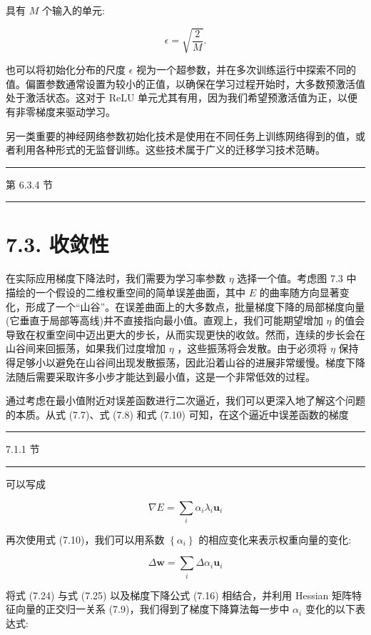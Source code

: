 \documentclass[10pt]{report}
\newcommand{\HRule}{\begin{center}\rule{0.9\linewidth}{0.2mm}\end{center}}
\begin{document}
具有 \(M\) 个输入的单元:

\[
\epsilon  = \sqrt{\frac{2}{M}}. \tag{7.23}
\]

也可以将初始化分布的尺度 \(\epsilon\) 视为一个超参数，并在多次训练运行中探索不同的值。偏置参数通常设置为较小的正值，以确保在学习过程开始时，大多数预激活值处于激活状态。这对于 ReLU 单元尤其有用，因为我们希望预激活值为正，以便有非零梯度来驱动学习。

另一类重要的神经网络参数初始化技术是使用在不同任务上训练网络得到的值，或者利用各种形式的无监督训练。这些技术属于广义的迁移学习技术范畴。

\HRule

第 6.3.4 节

\HRule

\section*{7.3. 收敛性}

在实际应用梯度下降法时，我们需要为学习率参数 \(\eta\) 选择一个值。考虑图 7.3 中描绘的一个假设的二维权重空间的简单误差曲面，其中 \(E\) 的曲率随方向显著变化，形成了一个“山谷”。在误差曲面上的大多数点，批量梯度下降的局部梯度向量(它垂直于局部等高线)并不直接指向最小值。直观上，我们可能期望增加 \(\eta\) 的值会导致在权重空间中迈出更大的步长，从而实现更快的收敛。然而，连续的步长会在山谷间来回振荡，如果我们过度增加 \(\eta\) ，这些振荡将会发散。由于必须将 \(\eta\) 保持得足够小以避免在山谷间出现发散振荡，因此沿着山谷的进展非常缓慢。梯度下降法随后需要采取许多小步才能达到最小值，这是一个非常低效的过程。

通过考虑在最小值附近对误差函数进行二次逼近，我们可以更深入地了解这个问题的本质。从式 (7.7)、式 (7.8) 和式 (7.10) 可知，在这个逼近中误差函数的梯度

\HRule

7.1.1 节

\HRule

可以写成

\[
\nabla E = \mathop{\sum }\limits_{i}{\alpha }_{i}{\lambda }_{i}{\mathbf{u}}_{i} \tag{7.24}
\]

再次使用式 (7.10)，我们可以用系数 \(\left\{  {\alpha }_{i}\right\}\) 的相应变化来表示权重向量的变化:

\[
\Delta \mathbf{w} = \mathop{\sum }\limits_{i}\Delta {\alpha }_{i}{\mathbf{u}}_{i} \tag{7.25}
\]

将式 (7.24) 与式 (7.25) 以及梯度下降公式 (7.16) 相结合，并利用 Hessian 矩阵特征向量的正交归一关系 (7.9)，我们得到了梯度下降算法每一步中 \({\alpha }_{i}\) 变化的以下表达式:
\end{document}
